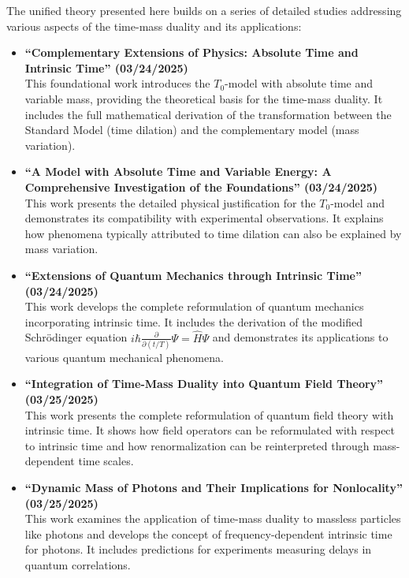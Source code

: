 \documentclass{article}
\begin{document}
	The unified theory presented here builds on a series of detailed studies addressing various aspects of the time-mass duality and its applications:
	
	\begin{itemize}
		\item \textbf{``Complementary Extensions of Physics: Absolute Time and Intrinsic Time'' (03/24/2025)} \\
		This foundational work introduces the \(T_0\)-model with absolute time and variable mass, providing the theoretical basis for the time-mass duality. It includes the full mathematical derivation of the transformation between the Standard Model (time dilation) and the complementary model (mass variation).
		
		\item \textbf{``A Model with Absolute Time and Variable Energy: A Comprehensive Investigation of the Foundations'' (03/24/2025)} \\
		This work presents the detailed physical justification for the \(T_0\)-model and demonstrates its compatibility with experimental observations. It explains how phenomena typically attributed to time dilation can also be explained by mass variation.
		
		\item \textbf{``Extensions of Quantum Mechanics through Intrinsic Time'' (03/24/2025)} \\
		This work develops the complete reformulation of quantum mechanics incorporating intrinsic time. It includes the derivation of the modified Schrödinger equation \(i\hbar \frac{\partial}{\partial (t/T)} \Psi = \hat{H} \Psi\) and demonstrates its applications to various quantum mechanical phenomena.
		
		\item \textbf{``Integration of Time-Mass Duality into Quantum Field Theory'' (03/25/2025)} \\
		This work presents the complete reformulation of quantum field theory with intrinsic time. It shows how field operators can be reformulated with respect to intrinsic time and how renormalization can be reinterpreted through mass-dependent time scales.
		
		\item \textbf{``Dynamic Mass of Photons and Their Implications for Nonlocality'' (03/25/2025)} \\
		This work examines the application of time-mass duality to massless particles like photons and develops the concept of frequency-dependent intrinsic time for photons. It includes predictions for experiments measuring delays in quantum correlations.
		

\end{itemize}
\end{document}
